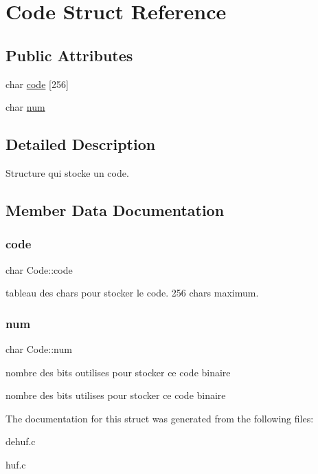 \hypertarget{structCode}{}\section{Code Struct Reference}
\label{structCode}
\subsection*{Public Attributes}
\begin{DoxyCompactItemize}
\item 
char \hyperlink{structCode_aa18460e99d203b16d73f780ac40ec177}{code} \mbox{[}256\mbox{]}
\item 
char \hyperlink{structCode_ab0239f269b01907a7c9b65be6deebc50}{num}
\end{DoxyCompactItemize}


\subsection{Detailed Description}
Structure qui stocke un code. 

\subsection{Member Data Documentation}
\mbox{\label{structCode_aa18460e99d203b16d73f780ac40ec177}} 
\subsubsection{\texorpdfstring{code}{code}}
{\footnotesize\ttfamily char Code\+::code}

tableau des chars pour stocker le code. 256 chars maximum. \mbox{\label{structCode_ab0239f269b01907a7c9b65be6deebc50}} 
\subsubsection{\texorpdfstring{num}{num}}
{\footnotesize\ttfamily char Code\+::num}

nombre des bits outilises pour stocker ce code binaire

nombre des bits utilises pour stocker ce code binaire 

The documentation for this struct was generated from the following files\+:\begin{DoxyCompactItemize}
\item 
dehuf.\+c\item 
huf.\+c\end{DoxyCompactItemize}
